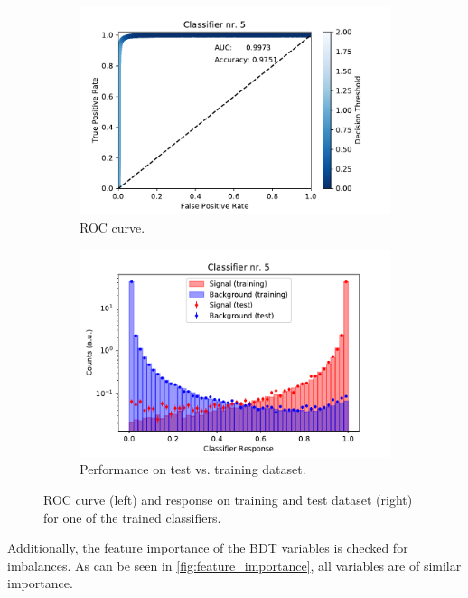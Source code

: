 \begin{figure}
  \centering
  \begin{subfigure}[b]{0.45\textwidth}
    \centering
    \includegraphics[width=\textwidth]{"content/plots/BDT/BDT_roc_auc4.pdf"}
    \caption{ROC curve.}
    \label{fig:roc_curve}
  \end{subfigure}
  \hfill
  \begin{subfigure}[b]{0.45\textwidth}
    \centering
    \includegraphics[width=\textwidth]{"content/plots/BDT/BDT_train_test4.pdf"}
    \caption{Performance on test vs. training dataset.}
    \label{fig:train_test}
  \end{subfigure}
  \caption{ROC curve (left) and response on training and test dataset (right) for one of the trained classifiers.}
  \label{fig:BDT}
\end{figure}
Additionally, the feature importance of the BDT variables is checked for imbalances. As can be seen in \autoref{fig:feature_importance}, all variables are of similar importance.
